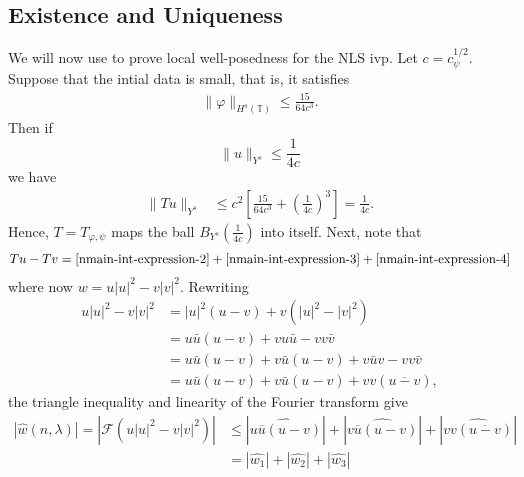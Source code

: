 \documentclass[12pt,reqno]{amsart}
\numberwithin{equation}{section}  %
\newcommand{\ci}{\mathbb{T}}
\newcommand{\wh}{\widehat}
\newcommand{\vp}{\varphi}
\renewcommand{\cref}{\Cref}
\begin{document}
\subsection{Existence and Uniqueness} 
\label{ssec:exis-uniq}
We will now use \cref{nprop:contraction} to prove local well-posedness for the 
NLS ivp. Let $c = c_{\psi}^{1/2}$. Suppose that the intial data is small, that
is, it satisfies
%
\begin{equation}
	\begin{split}
		\|\vp\|_{H^s(\ci)} \le \frac{15}{64c^3}.
	\end{split}
\end{equation}
%
Then if $$\|u\|_{Y^s} \le \frac{1}{4c}$$ we have
%
\begin{equation*}
	\begin{split}
		\|T u \|_{Y^s} 
		& \le c^2 \left[ \frac{15}{64c^3} + \left( 
		\frac{1}{4c} \right)^3 \right]
		=  \frac{1}{4c}.
	\end{split}
\end{equation*}
%
Hence, $T=T_{\vp, \psi}$ maps the ball $B_{Y^{s}}\left( \frac{1}{4c} \right)$ into 
itself. Next, note that
%
\begin{equation*}
	\begin{split}
		Tu - Tv = \eqref{nmain-int-expression-2} + \eqref{nmain-int-expression-3} 
		+ \eqref{nmain-int-expression-4}
	\end{split}
\end{equation*}
%
where now $w = u | u |^2 - v | v |^{2}$. Rewriting
%
\begin{equation*}
	\begin{split}
		u | u |^{2} - v | v |^{2}
		& = | u |^2 \left( u -v \right) + v\left( | u 
		|^2 - | v |^2
		\right)
		\\
		& = u \bar u \left( u -v \right) + v u \bar u - v v \bar v
		\\
		& = u \bar u \left( u - v \right) + v \bar u\left( u - v \right) + v 
		\bar u v - v v \bar v
		\\
		& = u \bar u \left( u -v \right) + v \bar u\left( u - v \right) + v v 
		\left( \overline{u -v} \right),
	\end{split}
\end{equation*}
%
the triangle inequality and linearity of the Fourier transform give
%
\begin{equation*}
	\begin{split}
		| \wh{w}(n, \lambda) | = | \mathcal{F}(u | u |^2 - v| v |^2) |
		& \le | \wh{u \overline{u} \left (u -v \right )} | +
		| \wh{v \overline{u} (u -v)} | + |\wh{v v 
		(\overline{u-v})}|
		\\
		& = | \wh{w_1} | + | \wh{w_2} | + | \wh{w_3} |
	\end{split}
\end{equation*}
\end{document}
